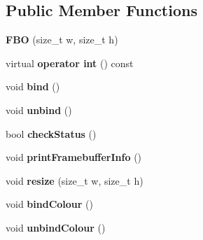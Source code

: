 \subsection*{\-Public \-Member \-Functions}
\begin{DoxyCompactItemize}
\item 
\hypertarget{classs9_1_1gl_1_1FBO_a55274f6a63e821b1ef6c80b1542c7dec}{{\bfseries \-F\-B\-O} (size\-\_\-t w, size\-\_\-t h)}\label{classs9_1_1gl_1_1FBO_a55274f6a63e821b1ef6c80b1542c7dec}

\item 
\hypertarget{classs9_1_1gl_1_1FBO_a46630d29923eff743c661be36b982656}{virtual {\bfseries operator int} () const }\label{classs9_1_1gl_1_1FBO_a46630d29923eff743c661be36b982656}

\item 
\hypertarget{classs9_1_1gl_1_1FBO_a8f800eef24f630b8a9afaaad3b3e6dd1}{void {\bfseries bind} ()}\label{classs9_1_1gl_1_1FBO_a8f800eef24f630b8a9afaaad3b3e6dd1}

\item 
\hypertarget{classs9_1_1gl_1_1FBO_aaa4e2eaacd8cb31bfd17eb584f86c1a1}{void {\bfseries unbind} ()}\label{classs9_1_1gl_1_1FBO_aaa4e2eaacd8cb31bfd17eb584f86c1a1}

\item 
\hypertarget{classs9_1_1gl_1_1FBO_a0758d3810e5cc455da7ac794ba96f53c}{bool {\bfseries check\-Status} ()}\label{classs9_1_1gl_1_1FBO_a0758d3810e5cc455da7ac794ba96f53c}

\item 
\hypertarget{classs9_1_1gl_1_1FBO_a7da5399c0bc7f99e2ce83b0b32196d9f}{void {\bfseries print\-Framebuffer\-Info} ()}\label{classs9_1_1gl_1_1FBO_a7da5399c0bc7f99e2ce83b0b32196d9f}

\item 
\hypertarget{classs9_1_1gl_1_1FBO_aead6dc20c20846784542db33adc407be}{void {\bfseries resize} (size\-\_\-t w, size\-\_\-t h)}\label{classs9_1_1gl_1_1FBO_aead6dc20c20846784542db33adc407be}

\item 
\hypertarget{classs9_1_1gl_1_1FBO_a86f9a325000288e8a550691e478d973b}{void {\bfseries bind\-Colour} ()}\label{classs9_1_1gl_1_1FBO_a86f9a325000288e8a550691e478d973b}

\item 
\hypertarget{classs9_1_1gl_1_1FBO_a348b1dedd7b71389ab3f38e9ead4323a}{void {\bfseries unbind\-Colour} ()}\label{classs9_1_1gl_1_1FBO_a348b1dedd7b71389ab3f38e9ead4323a}


\end{DoxyCompactItemize}
